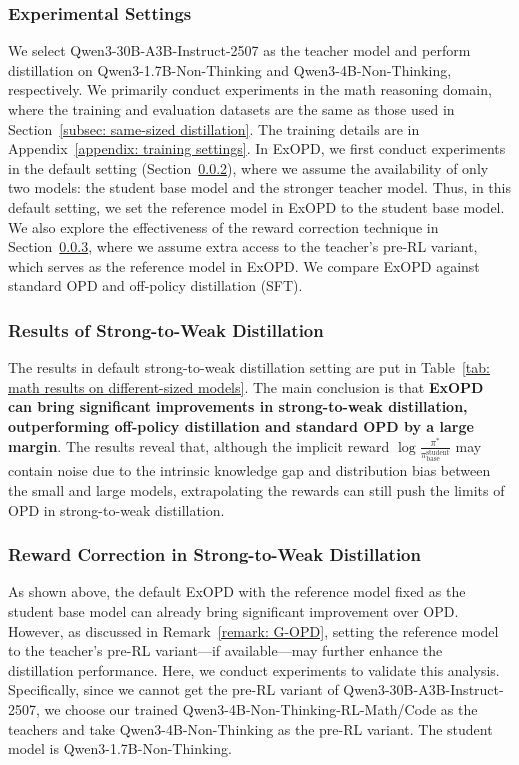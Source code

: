 \documentclass{article} %
\begin{document}
\subsubsection{Experimental Settings}
We select Qwen3-30B-A3B-Instruct-2507 as the teacher model and perform distillation on Qwen3-1.7B-Non-Thinking and Qwen3-4B-Non-Thinking, respectively. We primarily conduct experiments in the math reasoning domain, where the training and evaluation datasets are the same as those used in Section~\ref{subsec: same-sized distillation}. The training details are in Appendix~\ref{appendix: training settings}. In ExOPD, we first conduct experiments in the default setting (Section~\ref{subsubsec: strong-to-weak results}), where we assume the availability of only two models: the student base model and the stronger teacher model. Thus, in this default setting, we set the reference model in ExOPD to the student base model. We also explore the effectiveness of the reward correction technique in Section~\ref{subsubsec: reward correction}, where we assume extra access to the teacher's pre-RL variant, which serves as the reference model in ExOPD. We compare ExOPD against standard OPD and off-policy distillation (SFT). 




\subsubsection{Results of Strong-to-Weak Distillation}
\label{subsubsec: strong-to-weak results}
The results in default strong-to-weak distillation setting are put in Table~\ref{tab: math results on different-sized models}. The main conclusion is that \textbf{ExOPD can bring significant improvements in strong-to-weak distillation, outperforming off-policy distillation and standard OPD by a large margin}. The results reveal that, although the implicit reward $\log \frac{\pi^*}{\pi_{\text{base}}^{\text{student}}}$ may contain noise due to the intrinsic knowledge gap and distribution bias between the small and large models, extrapolating the rewards can still push the limits of OPD in strong-to-weak distillation.



\subsubsection{Reward Correction in Strong-to-Weak Distillation}
\label{subsubsec: reward correction}
As shown above, the default ExOPD with the reference model fixed as the student base model can already bring significant improvement over OPD. However, as discussed in Remark~\ref{remark: G-OPD}, setting the reference model to the teacher's pre-RL variant—if available—may further enhance the distillation performance. Here, we conduct experiments to validate this analysis. Specifically, since we cannot get the pre-RL variant of Qwen3-30B-A3B-Instruct-2507, we choose our trained Qwen3-4B-Non-Thinking-RL-Math/Code as the teachers and take Qwen3-4B-Non-Thinking as the pre-RL variant. The student model is Qwen3-1.7B-Non-Thinking.
\end{document}

